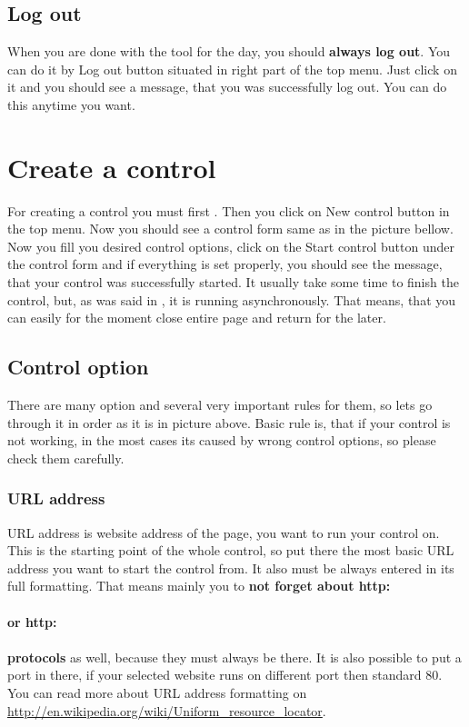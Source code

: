 \documentclass[12pt,a4paper]{article}
\begin{document}
\subsection{Log out} \label{logout}
When you are done with the tool for the day, you should \textbf{always log out}. You can do it by Log out button situated in right part of the top menu. Just click on it and you should see a message, that you was successfully log out. You can do this anytime you want.
\section{Create a control} \label{create}
For creating a control you must first . Then you click on New control button in the top menu. Now you should see a control form same as in the picture bellow. Now you fill you desired control options, click on the Start control button under the control form and if everything is set properly, you should see the message, that your control was successfully started. It usually take some time to finish the control, but, as was said in , it is running asynchronously. That means, that you can easily  for the moment close entire page and return for the  later.
\subsection{Control option} \label{options}
There are many option and several very important rules for them, so lets go through it in order as it is in picture above. Basic rule is, that if your control is not working, in the most cases its caused by wrong control options, so please check them carefully.
\subsubsection{URL address} \label{address}
URL address is website address of the page, you want to run your control on. This is the starting point of the whole control, so put there the most basic URL address you want to start the control from. It also must be always entered in its full formatting. That means mainly you to \textbf{not forget about http:\\\\ or http:\\\\ protocols} as well, because they must always be there. It is also possible to put a port in there, if your selected website runs on different port then standard 80. You can read more about URL address formatting on \url{http://en.wikipedia.org/wiki/Uniform_resource_locator}.
\end{document}
